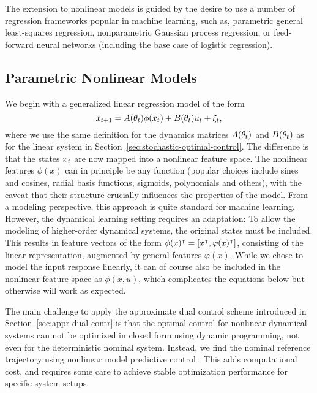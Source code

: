 The extension to nonlinear models is guided by the desire to use a number of
regression frameworks popular in machine learning, such as, parametric general
least-squares regression, nonparametric Gaussian process regression, or
feed-forward neural networks (including the base case of logistic regression).

\subsection{Parametric Nonlinear Models}
\label{sec:param-nonl-syst}

We begin with a generalized linear regression model of the form
\begin{equation}\label{eq:linear-regression-system}
  x_{\tk+1} = A(\t_\tk) \phi(x_\tk) + B(\t_\tk) u_\tk + \dist_\tk,
\end{equation}
where we use the same definition for the dynamics matrices $A(\theta_t)$ and
$B(\theta_t)$ as for the linear system in
Section~\ref{sec:stochastic-optimal-control}. The difference is that the states
$x_t$ are now mapped into a nonlinear feature space. The nonlinear features
$\phi(x)$ can in principle be any function (popular choices include sines and
cosines, radial basis functions, sigmoids, polynomials and others), with the
caveat that their structure crucially influences the properties of the model.
From a modeling perspective, this approach is quite standard for machine
learning. However, the dynamical learning setting requires an adaptation: To
allow the modeling of higher-order dynamical systems, the original states must
be included. This results in feature vectors of the form $\phi(x)^{\intercal} = [ x^{\intercal},
\varphi(x)^{\intercal}]$, consisting of the linear representation, augmented by general
features $\varphi(x)$. While we chose to model the input response linearly, it
can of course also be included in the nonlinear feature space as $\phi(x,u)$,
which complicates the equations below but otherwise will work as expected.

The main challenge to apply the approximate dual control scheme introduced in
Section~\ref{sec:appr-dual-contr} is that the optimal control for nonlinear
dynamical systems can not be optimized in closed form using dynamic programming,
not even for the deterministic nominal system. Instead, we find the nominal
reference trajectory using nonlinear model predictive control
%
%
.
This adds computational cost, and requires some care to achieve stable
optimization performance for specific system setups.

